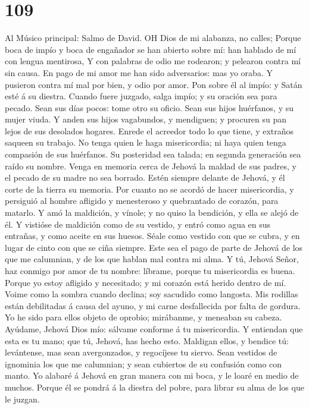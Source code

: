 \hypertarget{section-108}{%
\section{109}\label{section-108}}

 Al Músico principal: Salmo de David. OH Dios de mi
alabanza, no calles;  Porque boca de impío y boca de
engañador se han abierto sobre mí: han hablado de mí con lengua
mentirosa,  Y con palabras de odio me rodearon; y pelearon
contra mí sin causa.  En pago de mi amor me han sido
adversarios: mas yo oraba.  Y pusieron contra mí mal por
bien, y odio por amor.  Pon sobre él al impío: y Satán esté
á su diestra.  Cuando fuere juzgado, salga impío; y su
oración sea para pecado.  Sean sus días pocos: tome otro su
oficio.  Sean sus hijos huérfanos, y su mujer viuda.
 Y anden sus hijos vagabundos, y mendiguen; y procuren su
pan lejos de sus desolados hogares.  Enrede el acreedor
todo lo que tiene, y extraños saqueen su trabajo.  No tenga
quien le haga misericordia; ni haya quien tenga compasión de sus
huérfanos.  Su posteridad sea talada; en segunda generación
sea raído su nombre.  Venga en memoria cerca de Jehová la
maldad de sus padres, y el pecado de su madre no sea borrado.
 Estén siempre delante de Jehová, y él corte de la tierra
su memoria.  Por cuanto no se acordó de hacer misericordia,
y persiguió al hombre afligido y menesteroso y quebrantado de corazón,
para matarlo.  Y amó la maldición, y vínole; y no quiso la
bendición, y ella se alejó de él.  Y vistióse de maldición
como de su vestido, y entró como agua en sus entrañas, y como aceite en
sus huesos.  Séale como vestido con que se cubra, y en
lugar de cinto con que se ciña siempre.  Este sea el pago
de parte de Jehová de los que me calumnian, y de los que hablan mal
contra mi alma.  Y tú, Jehová Señor, haz conmigo por amor
de tu nombre: líbrame, porque tu misericordia es buena. 
Porque yo estoy afligido y necesitado; y mi corazón está herido dentro
de mí.  Voime como la sombra cuando declina; soy sacudido
como langosta.  Mis rodillas están debilitadas á causa del
ayuno, y mi carne desfallecida por falta de gordura.  Yo he
sido para ellos objeto de oprobio; mirábanme, y meneaban su cabeza.
 Ayúdame, Jehová Dios mío: sálvame conforme á tu
misericordia.  Y entiendan que esta es tu mano; que tú,
Jehová, has hecho esto.  Maldigan ellos, y bendice tú:
levántense, mas sean avergonzados, y regocíjese tu siervo. 
Sean vestidos de ignominia los que me calumnian; y sean cubiertos de su
confusión como con manto.  Yo alabaré á Jehová en gran
manera con mi boca, y le loaré en medio de muchos.  Porque
él se pondrá á la diestra del pobre, para librar su alma de los que le
juzgan.

